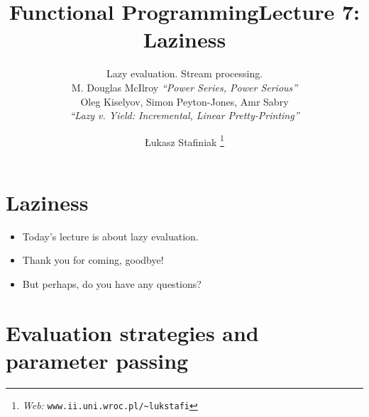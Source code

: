 \documentclass{beamer}
\newcommand{\tmem}[1]{{\em #1\/}}
\newcommand{\tmfnhomepage}[1]{\thanks{\textit{Web:} \texttt{#1}}}
\begin{document}
\title{Functional Programming}

\author{
  {\L}ukasz Stafiniak
  \tmfnhomepage{www.ii.uni.wroc.pl/\~{}lukstafi}
}


\maketitle

\title{Lecture 7: Laziness}

\subtitle{Lazy evaluation. Stream processing.\\
{\small{M. Douglas McIlroy {\tmem{``Power Series, Power Serious''}}\\
Oleg Kiselyov, Simon Peyton-Jones, Amr Sabry\\
{\tmem{``Lazy v. Yield: Incremental, Linear Pretty-Printing''}}}}}

\maketitle

{}

{\newpage}

\section{Laziness}

\begin{itemize}
  \item Today's lecture is about lazy evaluation.
  
  \item Thank you for coming, goodbye!
  
  \item But perhaps, do you have any questions?
\end{itemize}

\section{Evaluation strategies and parameter passing}
\end{document}
